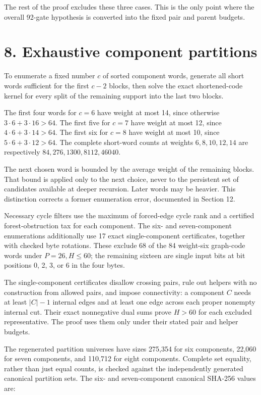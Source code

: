 The rest of the proof excludes these three cases. This is the only point where the overall 92-gate hypothesis is converted into the fixed pair and parent budgets.

\hypertarget{exhaustive-component-partitions}{%
\section{8. Exhaustive component partitions}\label{exhaustive-component-partitions}}

To enumerate a fixed number \(c\) of sorted component words, generate all short words sufficient for the first \(c-2\) blocks, then solve the exact shortened-code kernel for every split of the remaining support into the last two blocks.

The first four words for \(c=6\) have weight at most 14, since otherwise \(3\cdot6+3\cdot16>64\). The first five for \(c=7\) have weight at most 12, since \(4\cdot6+3\cdot14>64\). The first six for \(c=8\) have weight at most 10, since \(5\cdot6+3\cdot12>64\). The complete short-word counts at weights \(6,8,10,12,14\) are respectively \(84,276,1300,8112,46040\).

The next chosen word is bounded by the average weight of the remaining blocks. That bound is applied only to the next choice, never to the persistent set of candidates available at deeper recursion. Later words may be heavier. This distinction corrects a former enumeration error, documented in Section 12.

Necessary cycle filters use the maximum of forced-edge cycle rank and a certified forest-obstruction tax for each component. The six- and seven-component enumerations additionally use 17 exact single-component certificates, together with checked byte rotations. These exclude 68 of the 84 weight-six graph-code words under \(P=26,H\leq60\); the remaining sixteen are single input bits at bit positions 0, 2, 3, or 6 in the four bytes.

The single-component certificates disallow crossing pairs, rule out helpers with no construction from allowed pairs, and impose connectivity: a component \(C\) needs at least \(|C|-1\) internal edges and at least one edge across each proper nonempty internal cut. Their exact nonnegative dual sums prove \(H>60\) for each excluded representative. The proof uses them only under their stated pair and helper budgets.

The regenerated partition universes have sizes 275,354 for six components, 22,060 for seven components, and 110,712 for eight components. Complete set equality, rather than just equal counts, is checked against the independently generated canonical partition sets. The six- and seven-component canonical SHA-256 values are:

